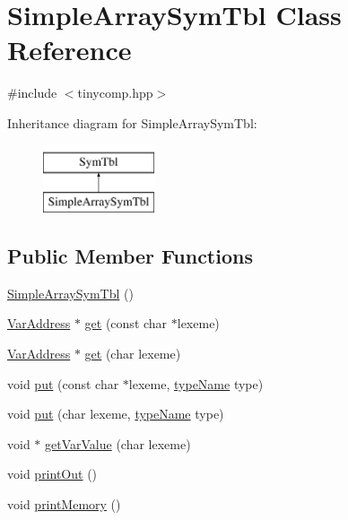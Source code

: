 \hypertarget{class_simple_array_sym_tbl}{}\section{Simple\+Array\+Sym\+Tbl Class Reference}
\label{class_simple_array_sym_tbl}


{\ttfamily \#include $<$tinycomp.\+hpp$>$}

Inheritance diagram for Simple\+Array\+Sym\+Tbl\+:\begin{figure}[H]
\begin{center}
\leavevmode
\includegraphics[height=2.000000cm]{class_simple_array_sym_tbl}
\end{center}
\end{figure}
\subsection*{Public Member Functions}
\begin{DoxyCompactItemize}
\item 
\hyperlink{class_simple_array_sym_tbl_a66b279785f28f0aefbaa0230792ef94a}{Simple\+Array\+Sym\+Tbl} ()
\item 
\hyperlink{class_var_address}{Var\+Address} $\ast$ \hyperlink{class_simple_array_sym_tbl_a28d6d5c513f7b8f2beee3a0cf6eab45b}{get} (const char $\ast$lexeme)
\item 
\hyperlink{class_var_address}{Var\+Address} $\ast$ \hyperlink{class_simple_array_sym_tbl_a56a8105f91e5436d8396ed57a374ed5f}{get} (char lexeme)
\item 
void \hyperlink{class_simple_array_sym_tbl_ac7a485531efeaf7b6ac6b5215e212a37}{put} (const char $\ast$lexeme, \hyperlink{tinycomp_8h_aca554671f4620139c1393f96d2af74bc}{type\+Name} type)
\item 
void \hyperlink{class_simple_array_sym_tbl_a12e8b965e1d43cf9b037c262d0400295}{put} (char lexeme, \hyperlink{tinycomp_8h_aca554671f4620139c1393f96d2af74bc}{type\+Name} type)
\item 
void $\ast$ \hyperlink{class_simple_array_sym_tbl_a2f8a29297406612782319c8b069ce17a}{get\+Var\+Value} (char lexeme)
\item 
void \hyperlink{class_simple_array_sym_tbl_aa96c422e9a48887d1756d1b13d2f41d3}{print\+Out} ()
\item 
void \hyperlink{class_simple_array_sym_tbl_af761f997d593f4da432a8ba448b4fae2}{print\+Memory} ()
\end{DoxyCompactItemize}
